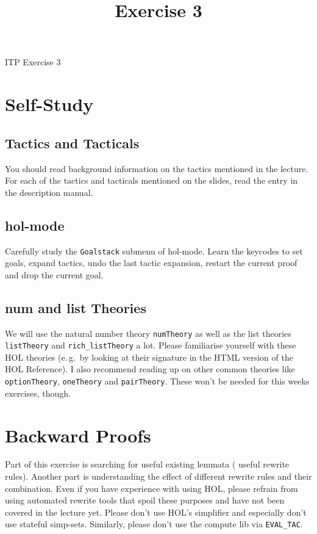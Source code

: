 \documentclass[a4paper,10pt,oneside]{scrartcl}
\title{Exercise 3}
\begin{document}
\begin{center}
ITP Exercise 3
\end{center}
\bigskip


\section{Self-Study}

\subsection{Tactics and Tacticals}
You should read background information on the tactics mentioned in the
lecture. For each of the tactics and tacticals mentioned on the
slides, read the entry in the description manual.

\subsection{hol-mode}

Carefully study the \texttt{Goalstack} submenu of hol-mode. Learn the keycodes to
set goals, expand tactics, undo the last tactic expansion, restart the current proof and
drop the current goal.

\subsection{num and list Theories}

We will use the natural number theory \texttt{numTheory} as well as the list theories
\texttt{listTheory} and \texttt{rich\_listTheory} a lot. Please familiarise yourself with
these HOL theories (e.\,g.\ by looking at their signature in the HTML version of the HOL Reference). I also recommend reading up on other common theories like \texttt{optionTheory}, \texttt{oneTheory} and \texttt{pairTheory}. These won't be needed for this weeks exercises, though.


\section{Backward Proofs}

Part of this exercise is searching for useful existing lemmata (\eg
useful rewrite rules).  Another part is understanding the effect of
different rewrite rules and their combination.  Even if you have
experience with using HOL, please refrain from using automated rewrite
tools that spoil these purposes and have not been covered in the
lecture yet. Please don't use HOL's simplifier and especially don't
use stateful simp-sets.  Similarly, please don't use the compute lib
via \eg \texttt{EVAL\_TAC}.
\end{document}
